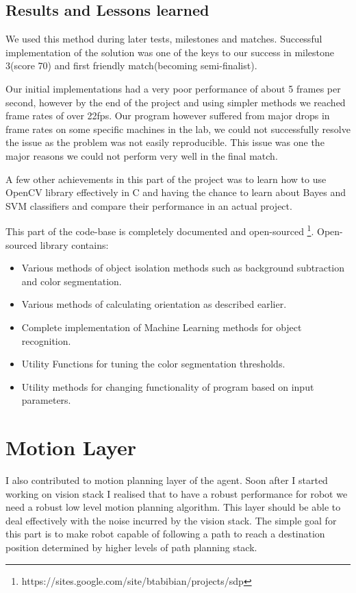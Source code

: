 \documentclass[conference,12pt]{IEEEtran}
\begin{document}
\subsection{Results and Lessons learned}
We used this method during later tests, milestones and matches. Successful implementation of the solution was one of the keys to our success in milestone 3(score 70) and first friendly match(becoming semi-finalist).

Our initial implementations had a very poor performance of about 5 frames per second, however by the end of the project and using simpler methods we reached frame rates of over 22fps. Our program however suffered from major drops in frame rates on some specific machines in the lab, we could not successfully resolve the issue as the problem was not easily reproducible. This issue was one the major reasons we could not perform very well in the final match.

A few other achievements in this part of the project was to learn how to use OpenCV library effectively in C and having the chance to learn about Bayes and SVM classifiers and compare their performance in an actual project.

This part of the code-base is completely documented and open-sourced \footnote{https://sites.google.com/site/btabibian/projects/sdp}. Open-sourced library contains:
\begin{itemize}
\item Various methods of object isolation methods such as background subtraction and color segmentation.
\item Various methods of calculating orientation as described earlier.
\item Complete implementation of Machine Learning methods for object recognition.
\item Utility Functions for tuning the color segmentation thresholds.
\item Utility methods for changing functionality of program based on input parameters.
\end{itemize}
\vspace{-3 mm}
\section{Motion Layer}
\vspace{-1 mm}
I also contributed to motion planning layer of the agent. Soon after I started working on vision stack I realised that to have a robust performance for robot we need a robust low level motion planning algorithm. This layer should be able to deal effectively with the noise incurred by the vision stack. The simple goal for this part is to make robot capable of following a path to reach a destination position determined by higher levels of path planning stack.
\end{document}
